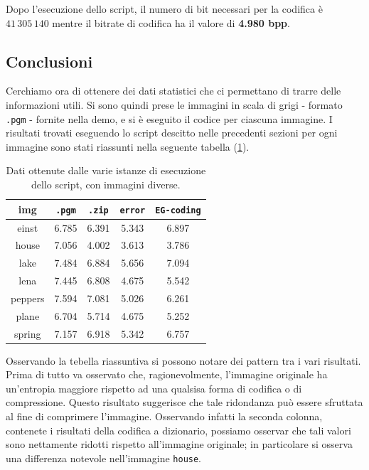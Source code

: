 \noindent Dopo l'esecuzione dello script, il numero di bit necessari per la codifica è $41\,305\,140$ mentre il bitrate di codifica ha il valore di \textbf{4.980 bpp}.


\subsection{Conclusioni}
Cerchiamo ora di ottenere dei dati statistici che ci permettano di trarre delle informazioni utili. Si sono quindi prese le immagini in scala di grigi - formato \texttt{.pgm} - fornite nella demo, e si è eseguito il codice per ciascuna immagine. I risultati trovati eseguendo lo script descitto nelle precedenti sezioni per ogni immagine sono stati riassunti nella seguente tabella (\ref{tab:simple-conclusions}).


\begin{table}[h]
    \centering
    \renewcommand{\arraystretch}{1.5}
    \begin{tabular}{| c | c c c c |}
        \hline
        \textbf{img} & \texttt{.pgm} & \texttt{.zip} & \texttt{error} & \texttt{EG-coding} \\ \hline \hline

        einst & 6.785  & 6.391 & 5.343 & 6.897 \\

        house & 7.056  & 4.002 & 3.613 & 3.786 \\

        lake & 7.484  & 6.884 & 5.656 & 7.094 \\

        lena & 7.445  & 6.808 & 4.675 & 5.542 \\

        peppers & 7.594  & 7.081 & 5.026 & 6.261 \\

        plane & 6.704  & 5.714 & 4.675 & 5.252 \\

        spring & 7.157 & 6.918 & 5.342 & 6.757 \\
        \hline
    \end{tabular}
    \caption{Dati ottenute dalle varie istanze di esecuzione dello script, con immagini diverse.}
    \label{tab:simple-conclusions}
    \renewcommand{\arraystretch}{1}
\end{table}

\noindent Osservando la tebella riassuntiva si possono notare dei pattern tra i vari risultati. Prima di tutto va osservato che, ragionevolmente, l'immagine originale ha un'entropia maggiore rispetto ad una qualsisa forma di codifica o di compressione. Questo risultato suggerisce che tale ridondanza può essere sfruttata al fine di comprimere l'immagine. Osservando infatti la seconda colonna, contenete i risultati della codifica a dizionario, possiamo osservar che tali valori sono nettamente ridotti rispetto all'immagine originale; in particolare si osserva una differenza notevole nell'immagine \texttt{house}. 

